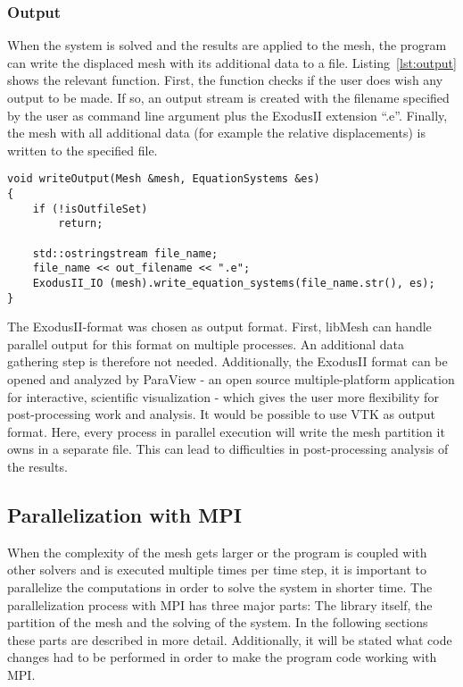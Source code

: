   \subsubsection{Output}\label{sec:Impl-Details-Output}
   When the system is solved and the results are applied to the mesh, the program can write the displaced mesh with its additional data to a file. Listing~\ref{lst:output} shows the relevant function. First, the function checks if the user does wish any output to be made. If so, an output stream is created with the filename specified by the user as command line argument plus the ExodusII extension ``.e''. Finally, the mesh with all additional data (for example the relative displacements) is written to the specified file.
\begin{lstlisting}[caption=Store results in mesh file,label=lst:output,keepspaces=true]
void writeOutput(Mesh &mesh, EquationSystems &es)
{
	if (!isOutfileSet)
		return;
	
	std::ostringstream file_name;
	file_name << out_filename << ".e";	
	ExodusII_IO (mesh).write_equation_systems(file_name.str(), es);
}  
\end{lstlisting}
   The ExodusII-format was chosen as output format. First, libMesh can handle parallel output for this format on multiple processes. An additional data gathering step is therefore not needed. Additionally, the ExodusII format can be opened and analyzed by ParaView - an open source multiple-platform application for interactive, scientific visualization - which gives the user more flexibility for post-processing work and analysis. It would be possible to use VTK as output format. Here, every process in parallel execution will write the mesh partition it owns in a separate file. This can lead to difficulties in post-processing analysis of the results.
    
 
 
 \subsection{Parallelization with MPI}\label{sec:Impl-Parallel}
  When the complexity of the mesh gets larger or the program is coupled with other solvers and is executed multiple times per time step, it is important to parallelize the computations in order to solve the system in shorter time. The parallelization process with MPI has three major parts: The library itself, the partition of the mesh and the solving of the system. In the following sections these parts are described in more detail. Additionally, it will be stated what code changes had to be performed in order to make the program code working with MPI.
 
